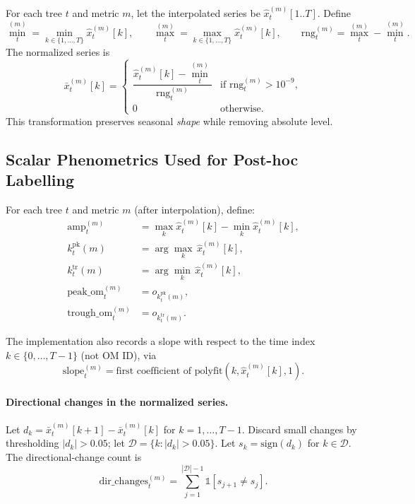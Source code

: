 For each tree $t$ and metric $m$, let the interpolated series be $\hat{x}^{(m)}_{t}[1..T]$.
Define
\begin{equation}
\min_t^{(m)}=\min_{k\in\{1,\dots,T\}} \hat{x}^{(m)}_{t}[k],
\qquad
\max_t^{(m)}=\max_{k\in\{1,\dots,T\}} \hat{x}^{(m)}_{t}[k],
\qquad
\mathrm{rng}_t^{(m)}=\max_t^{(m)}-\min_t^{(m)}.
\end{equation}
The normalized series is
\begin{equation}
\bar{x}^{(m)}_{t}[k] =
\begin{cases}
\dfrac{\hat{x}^{(m)}_{t}[k]-\min_t^{(m)}}{\mathrm{rng}_t^{(m)}} & \text{if } \mathrm{rng}_t^{(m)} > 10^{-9},\\
0 & \text{otherwise.}
\end{cases}
\end{equation}
This transformation preserves seasonal \emph{shape} while removing absolute level.

\subsection{Scalar Phenometrics Used for Post-hoc Labelling}

For each tree $t$ and metric $m$ (after interpolation), define:
\begin{align}
\mathrm{amp}_t^{(m)} &= \max_{k} \hat{x}^{(m)}_t[k] - \min_{k} \hat{x}^{(m)}_t[k],\\
k^{\mathrm{pk}}_t(m) &= \arg\max_{k}\,\hat{x}^{(m)}_t[k],\\
k^{\mathrm{tr}}_t(m) &= \arg\min_{k}\,\hat{x}^{(m)}_t[k],\\
\mathrm{peak\_om}_t^{(m)} &= o_{k^{\mathrm{pk}}_t(m)},\\
\mathrm{trough\_om}_t^{(m)} &= o_{k^{\mathrm{tr}}_t(m)}.
\end{align}

The implementation also records a slope with respect to the time index $k\in\{0,\dots,T-1\}$ (not OM ID), via
\begin{equation}
\mathrm{slope}_t^{(m)} = \text{first coefficient of } \mathrm{polyfit}(k,\hat{x}^{(m)}_t[k],1).
\end{equation}

\paragraph{Directional changes in the normalized series.}
Let $d_k = \bar{x}^{(m)}_t[k+1]-\bar{x}^{(m)}_t[k]$ for $k=1,\dots,T-1$.
Discard small changes by thresholding $|d_k|>0.05$; let $\mathcal{D}=\{k: |d_k|>0.05\}$.
Let $s_k=\mathrm{sign}(d_k)$ for $k\in\mathcal{D}$.
The directional-change count is
\begin{equation}
\mathrm{dir\_changes}_t^{(m)} = \sum_{j=1}^{|\mathcal{D}|-1} \mathbb{1}[s_{j+1}\ne s_j].
\end{equation}

